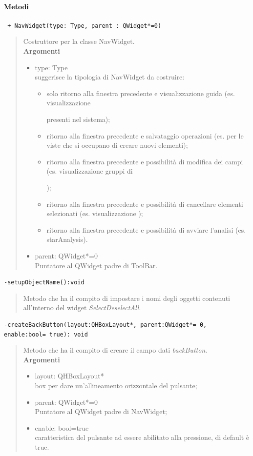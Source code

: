\paragraph{\textcolor{black}{Metodi\\}}
\color{blue}\verb! + NavWidget(type: Type, parent : QWidget*=0)!
\begin{quote}
\color{black}Costruttore per la classe NavWidget. \\
\textbf{Argomenti}
\begin{itemize}
\item type: Type \\ suggerisce la tipologia di NavWidget da costruire:
\begin{itemize}
\item solo ritorno alla finestra precedente e visualizzazione guida (es. visualizzazione \subject{} presenti nel sistema);
\item ritorno alla finestra precedente e salvataggio operazioni (es. per le viste che si occupano di creare nuovi elementi);
\item ritorno alla finestra precedente e possibilità di modifica dei campi (es. visualizzazione gruppi di \subject{});
\item ritorno alla finestra precedente e possibilità di cancellare elementi selezionati (es. visualizzazione \protocol{});
\item ritorno alla finestra precedente e possibilità di avviare l'analisi (es. starAnalysis).
\end{itemize}
\item parent: QWidget*=0  \\ Puntatore al QWidget padre di ToolBar.
\end{itemize}
\end{quote}
\color{blue}\verb!-setupObjectName():void!
\color{black}
\begin{quote}Metodo che ha il compito di impostare i nomi degli oggetti contenuti all'interno del widget \emph{SelectDeselectAll}.
\end{quote} 
\color{black}
\color{blue}\verb!-createBackButton(layout:QHBoxLayout*, parent:QWidget*= 0, enable:bool= true): void!
\color{black}
\begin{quote}Metodo che ha il compito di creare il campo dati \emph{backButton}.\\
\textbf{Argomenti}
\begin{itemize}
\item layout: QHBoxLayout* \\ box per dare un'allineamento orizzontale del pulsante;
\item parent: QWidget*=0  \\ Puntatore al QWidget padre di NavWidget;
\item enable: bool=true \\ caratteristica del pulsante ad essere abilitato alla pressione, di default è true.
\end{itemize}
\end{quote}
